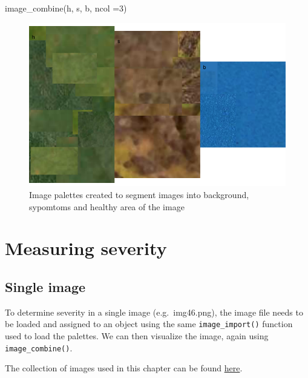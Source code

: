 \documentclass[
  letterpaper,
  DIV=11,
  numbers=noendperiod]{scrreprt}
\newenvironment{Shaded}{\begin{snugshade}}{\end{snugshade}}
\newcommand{\AttributeTok}[1]{\textcolor[rgb]{0.40,0.45,0.13}{#1}}
\newcommand{\DecValTok}[1]{\textcolor[rgb]{0.68,0.00,0.00}{#1}}
\newcommand{\FunctionTok}[1]{\textcolor[rgb]{0.28,0.35,0.67}{#1}}
\newcommand{\NormalTok}[1]{\textcolor[rgb]{0.00,0.23,0.31}{#1}}
\begin{document}
\begin{Shaded}
\begin{Highlighting}[]
\FunctionTok{image\_combine}\NormalTok{(h, s, b, }\AttributeTok{ncol =}\DecValTok{3}\NormalTok{)}
\end{Highlighting}
\end{Shaded}

\begin{figure}[H]

{\centering \includegraphics{data-actual-severity_files/figure-pdf/fig-palettes-1.pdf}

}

\caption{\label{fig-palettes}Image palettes created to segment images
into background, sypomtoms and healthy area of the image}

\end{figure}

\hypertarget{measuring-severity}{%
\section{Measuring severity}\label{measuring-severity}}

\hypertarget{single-image}{%
\subsection{Single image}\label{single-image}}

To determine severity in a single image (e.g.~img46.png), the image file
needs to be loaded and assigned to an object using the same
\texttt{image\_import()} function used to load the palettes. We can then
visualize the image, again using \texttt{image\_combine()}.

\begin{tcolorbox}[enhanced jigsaw, bottomtitle=1mm, colbacktitle=quarto-callout-tip-color!10!white, breakable, left=2mm, leftrule=.75mm, rightrule=.15mm, toprule=.15mm, colframe=quarto-callout-tip-color-frame, arc=.35mm, toptitle=1mm, opacityback=0, coltitle=black, title=\textcolor{quarto-callout-tip-color}{\faLightbulb}\hspace{0.5em}{Tip}, colback=white, titlerule=0mm, bottomrule=.15mm, opacitybacktitle=0.6]

The collection of images used in this chapter can be found
\href{https://github.com/emdelponte/epidemiology-R/tree/main/imgs/originals}{here}.

\end{tcolorbox}
\end{document}
